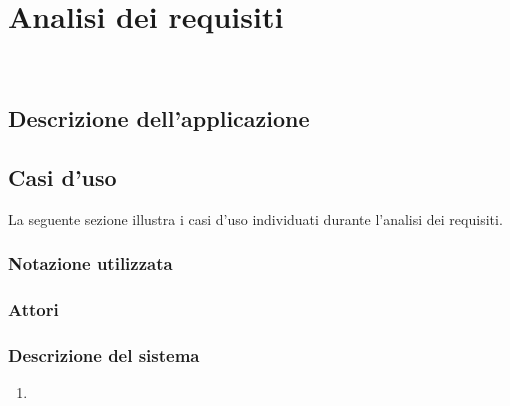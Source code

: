 \chapter{Analisi dei requisiti}
\label{cap:analisi-requisiti}

\\

\section{Descrizione dell'applicazione}

\section{Casi d'uso}

La seguente sezione illustra i casi d'uso individuati durante l'analisi dei requisiti. 

\subsection{Notazione utilizzata}

\subsection{Attori}


\subsection{Descrizione del sistema}

\begin{usecase}{}{}\label{uc:}
    \usecasepre{}
    \usecasedesc{}
    \usecasepost{}

    \usecasemain{}
        \begin{enumerate}
            \item 
        \end{enumerate}

\end{usecase}

